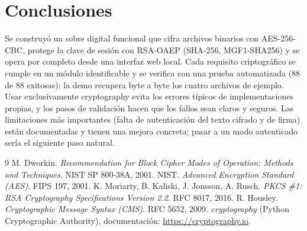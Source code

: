 \documentclass[11pt,a4paper]{article}
\newcommand{\cod}[1]{{\ttfamily\let\_\relax\def\_{\textunderscore\penalty0\hskip0pt\relax}\def\/{\slash\penalty0\hskip0pt\relax}#1}}
\begin{document}
\section{Conclusiones}
Se construyó un sobre digital funcional que cifra archivos binarios con AES-256-CBC, protege la clave de
sesión con RSA-OAEP (SHA-256, MGF1-SHA256) y se opera por completo desde una interfaz web local. Cada requisito
criptográfico se cumple en un módulo identificable y se verifica con una prueba automatizada (88 de 88 exitosas);
la demo recupera byte a byte los cuatro archivos de ejemplo. Usar exclusivamente \cod{cryptography} \cite{crypto} evita los
errores típicos de implementaciones propias, y los pasos de validación hacen que los fallos sean claros y
seguros. Las limitaciones más importantes (falta de autenticación del texto cifrado y de firma) están
documentadas y tienen una mejora concreta; pasar a un modo autenticado sería el siguiente paso natural.

\begin{thebibliography}{9}
 M. Dworkin. \emph{Recommendation for Block Cipher Modes of Operation: Methods and
  Techniques}. NIST SP 800-38A, 2001.
 NIST. \emph{Advanced Encryption Standard (AES)}. FIPS 197, 2001.
 K. Moriarty, B. Kaliski, J. Jonsson, A. Rusch. \emph{PKCS \#1: RSA Cryptography
  Specifications Version 2.2}. RFC 8017, 2016.
 R. Housley. \emph{Cryptographic Message Syntax (CMS)}. RFC 5652, 2009.
 \emph{cryptography} (Python Cryptographic Authority), documentación:
  \url{https://cryptography.io}.
\end{thebibliography}
\end{document}

